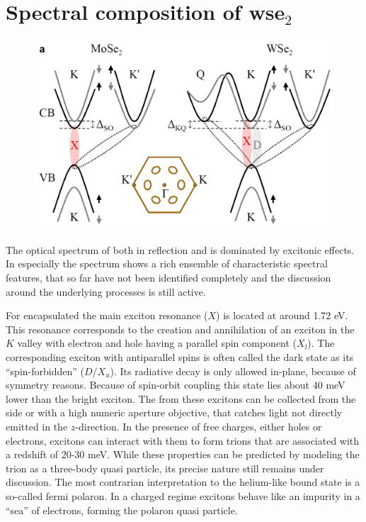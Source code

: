 \section{Spectral composition of ws\textup{e}$_2$}\label{composition}

\begin{figure}[t]
\centering
\includegraphics[width=.8\textwidth]{Band_structure_momentum_dark}
\caption{}\label{bands}
\end{figure}

The optical spectrum of \tmds both in reflection and \pl is dominated by excitonic effects. In \wse especially the \pl spectrum shows a rich ensemble of characteristic spectral features, that so far have not been identified completely and the discussion around the underlying processes is still active.

For \hbng encapsulated \wse the main exciton resonance ($X$) is located at around 1.72 eV. This resonance corresponds to the creation and annihilation of an exciton in the $K$ valley with electron and hole having a parallel spin component ($X_l$). The corresponding exciton with antiparallel spins is often called the dark state as its ``spin-forbidden'' ($D$/$X_u$). Its radiative decay is only allowed in-plane, because of symmetry reasons\texttrademark. Because of spin-orbit coupling this state lies about 40 meV lower than the bright exciton\cite{echeverry_splitting_2016}. The \pl from these excitons can be collected from the side or with a high numeric aperture objective, that catches light not directly emitted in the $z$-direction\cite{robert_fine_2017, wang_-plane_2017}. In the presence of free charges, either holes or electrons, excitons can interact with them to form trions that are associated with a redshift of 20-30 meV\cite{courtade_charged_2017}. While these properties can be predicted by modeling the trion as a three-body quasi particle, its precise nature still remains under discussion. The most contrarian interpretation to the helium-like bound state is a so-called fermi polaron. In a charged regime excitons behave like an impurity in a ``sea'' of electrons, forming the polaron quasi particle\cite{sidler_fermi_2016, efimkin_many-body_2017,schmidt_fermi_2012}.

